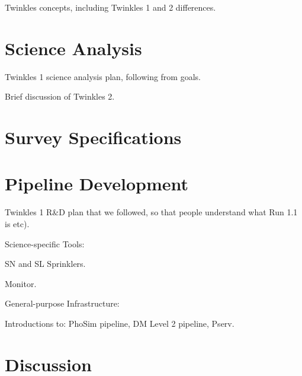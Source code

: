 \documentclass[\docopts]{\docclass}
\begin{document}
Twinkles concepts, including Twinkles 1 and 2 differences.



\section{Science Analysis}
\label{sec:science}

Twinkles 1 science analysis plan, following from goals.

Brief discussion of Twinkles 2.





\section{Survey Specifications}
\label{sec:survey}



\section{Pipeline Development}
\label{sec:pipeline}

Twinkles 1 R\&D plan that we followed, so that people understand what Run 1.1 is etc).



Science-specific Tools:

SN and SL Sprinklers.

Monitor.




General-purpose Infrastructure:

Introductions to: PhoSim pipeline, DM Level 2 pipeline, Pserv.





\section{Discussion}
\label{sec:discussion}
\end{document}
